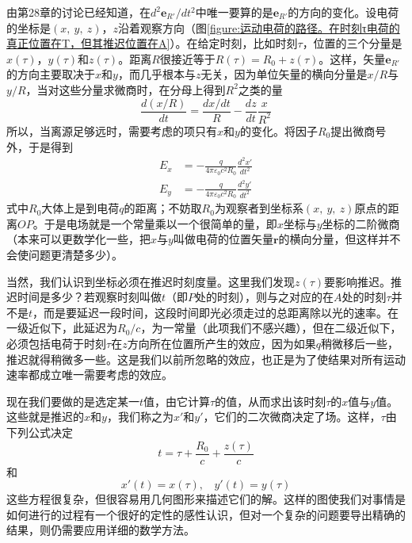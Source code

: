 由第28章的讨论已经知道，在$d^2\boldsymbol{e}_{R'}/dt^2$中唯一要算的是$\boldsymbol{e}_{R'}$的方向的变化。设电荷的坐标是$(x,~y,~z)$，$z$沿着观察方向（图\ref{figure:运动电荷的路径。在时刻τ电荷的真正位置在T，但其推迟位置在A}）。在给定时刻，比如时刻$\tau$，位置的三个分量是$x(\tau)$，$y(\tau)$和$z(\tau)$。距离$R$很接近等于$R(\tau)=R_0+z(\tau)$。这样，矢量$\boldsymbol{e}_{R'}$的方向主要取决于$x$和$y$，而几乎根本与$z$无关，因为单位矢量的横向分量是$x/R$与$y/R$，当对这些分量求微商时，在分母上得到$R^2$之类的量
\begin{equation*}
    \frac{d(x/R)}{dt} = \frac{dx/dt}{R} - \frac{dz}{dt}\frac{x}{R^2}
\end{equation*}
所以，当离源足够远时，需要考虑的项只有$x$和$y$的变化。将因子$R_0$提出微商号外，于是得到
\begin{equation}
    \label{Eq:I:34:3}
    \begin{aligned}
        E_x &= -\frac{q}{4\pi\varepsilon_0c^2R_0}\frac{d^2x'}{dt^2} \\
        E_y &= -\frac{q}{4\pi\varepsilon_0c^2R_0}\frac{d^2y'}{dt^2}
    \end{aligned}
\end{equation}
式中$R_0$大体上是到电荷$q$的距离；不妨取$R_0$为观察者到坐标系$(x,~y,~z)$原点的距离$OP$。于是电场就是一个常量乘以一个很简单的量，即$x$坐标与$y$坐标的二阶微商（本来可以更数学化一些，把$x$与$y$叫做电荷的位置矢量$\boldsymbol{r}$的横向分量，但这样并不会使问题更清楚多少）。

当然，我们认识到坐标必须在推迟时刻度量。这里我们发现$z(\tau)$要影响推迟。推迟时间是多少？若观察时刻叫做$t$（即$P$处的时刻），则与之对应的在$A$处的时刻$\tau$并不是$t$，而是要延迟一段时间，这段时间即光必须走过的总距离除以光的速率。在一级近似下，此延迟为$R_0/c$，为一常量（此项我们不感兴趣），但在二级近似下，必须包括电荷于时刻$\tau$在$z$方向所在位置所产生的效应，因为如果$q$稍微移后一些，推迟就得稍微多一些。这是我们以前所忽略的效应，也正是为了使结果对所有运动速率都成立唯一需要考虑的效应。

现在我们要做的是选定某一$t$值，由它计算$\tau$的值，从而求出该时刻$\tau$的$x$值与$y$值。这些就是推迟的$x$和$y$，我们称之为$x'$和$y'$，它们的二次微商决定了场。这样，$\tau$由下列公式决定
\begin{equation*}
    t = \tau + \frac{R_0}{c} + \frac{z(\tau)}{c}
\end{equation*}
和
\begin{equation}
    \label{Eq:I:34:4}
    x'(t) = x(\tau), ~~~~ y'(t) = y(\tau)
\end{equation}
这些方程很复杂，但很容易用几何图形来描述它们的解。这样的图使我们对事情是如何进行的过程有一个很好的定性的感性认识，但对一个复杂的问题要导出精确的结果，则仍需要应用详细的数学方法。

